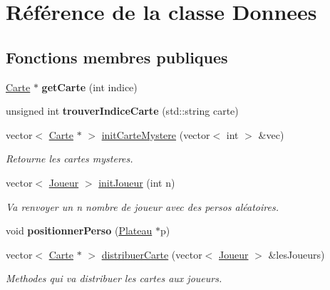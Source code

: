 \hypertarget{classDonnees}{\section{\-Référence de la classe \-Donnees}
\label{classDonnees}
}
\subsection*{\-Fonctions membres publiques}
\begin{DoxyCompactItemize}
\item 
\hypertarget{classDonnees_af238721bd5caba48da9d7531f1156f18}{\hyperlink{classCarte}{\-Carte} $\ast$ {\bfseries get\-Carte} (int indice)}\label{classDonnees_af238721bd5caba48da9d7531f1156f18}

\item 
\hypertarget{classDonnees_a452ba40b985045dbe8d5586514464629}{unsigned int {\bfseries trouver\-Indice\-Carte} (std\-::string carte)}\label{classDonnees_a452ba40b985045dbe8d5586514464629}

\item 
vector$<$ \hyperlink{classCarte}{\-Carte} $\ast$ $>$ \hyperlink{classDonnees_a574a33fb002aa10927bd97c39b84839b}{init\-Carte\-Mystere} (vector$<$ int $>$ \&vec)
\begin{DoxyCompactList}\small\item\em \-Retourne les cartes mysteres. \end{DoxyCompactList}\item 
vector$<$ \hyperlink{classJoueur}{\-Joueur} $>$ \hyperlink{classDonnees_a85ad060f19a3f27d07699495b8be4fe0}{init\-Joueur} (int n)
\begin{DoxyCompactList}\small\item\em \-Va renvoyer un n nombre de joueur avec des persos aléatoires. \end{DoxyCompactList}\item 
\hypertarget{classDonnees_a1f7c9ce96432a2cb384d4f1fb22c59f7}{void {\bfseries positionner\-Perso} (\hyperlink{classPlateau}{\-Plateau} $\ast$p)}\label{classDonnees_a1f7c9ce96432a2cb384d4f1fb22c59f7}

\item 
vector$<$ \hyperlink{classCarte}{\-Carte} $\ast$ $>$ \hyperlink{classDonnees_ae61912de3804ec0a33be8a3168a41b72}{distribuer\-Carte} (vector$<$ \hyperlink{classJoueur}{\-Joueur} $>$ \&les\-Joueurs)
\begin{DoxyCompactList}\small\item\em \-Methodes qui va distribuer les cartes aux joueurs. \end{DoxyCompactList}\end{DoxyCompactItemize}


